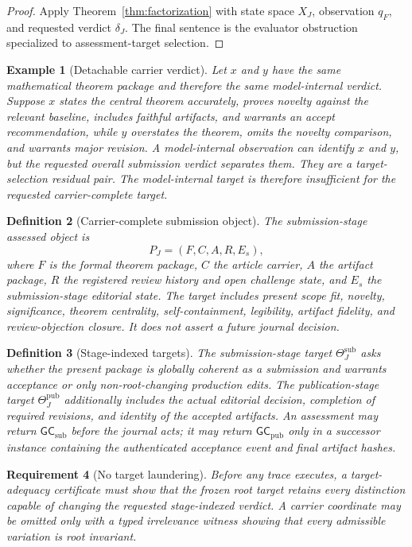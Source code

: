 \documentclass[10pt]{article}
\newtheorem{definition}{Definition}[section]
\newtheorem{example}[definition]{Example}
\newtheorem{requirement}[definition]{Requirement}
\newcommand{\Target}{\Theta}
\newcommand{\GCsub}{\mathsf{GC}_{\mathrm{sub}}}
\newcommand{\GCpub}{\mathsf{GC}_{\mathrm{pub}}}
\begin{document}
\begin{proof}
Apply Theorem~\ref{thm:factorization} with state space $X_J$, observation $q_F$, and requested verdict $\delta_J$.  The final sentence is the evaluator obstruction specialized to assessment-target selection.
\end{proof}

\begin{example}[Detachable carrier verdict]
Let $x$ and $y$ have the same mathematical theorem package and therefore the same model-internal verdict.  Suppose $x$ states the central theorem accurately, proves novelty against the relevant baseline, includes faithful artifacts, and warrants an accept recommendation, while $y$ overstates the theorem, omits the novelty comparison, and warrants major revision.  A model-internal observation can identify $x$ and $y$, but the requested overall submission verdict separates them.  They are a target-selection residual pair.  The model-internal target is therefore insufficient for the requested carrier-complete target.
\end{example}

\begin{definition}[Carrier-complete submission object]
The submission-stage assessed object is
\[
  P_J=(F,C,A,R,E_s),
\]
where $F$ is the formal theorem package, $C$ the article carrier, $A$ the artifact package, $R$ the registered review history and open challenge state, and $E_s$ the submission-stage editorial state.  The target includes present scope fit, novelty, significance, theorem centrality, self-containment, legibility, artifact fidelity, and review-objection closure.  It does not assert a future journal decision.
\end{definition}

\begin{definition}[Stage-indexed targets]
The submission-stage target $\Target_J^{\mathrm{sub}}$ asks whether the present package is globally coherent as a submission and warrants acceptance or only non-root-changing production edits.  The publication-stage target $\Target_J^{\mathrm{pub}}$ additionally includes the actual editorial decision, completion of required revisions, and identity of the accepted artifacts.  An assessment may return $\GCsub$ before the journal acts; it may return $\GCpub$ only in a successor instance containing the authenticated acceptance event and final artifact hashes.
\end{definition}

\begin{requirement}[No target laundering]
Before any trace executes, a target-adequacy certificate must show that the frozen root target retains every distinction capable of changing the requested stage-indexed verdict.  A carrier coordinate may be omitted only with a typed irrelevance witness showing that every admissible variation is root invariant.
\end{requirement}
\end{document}
